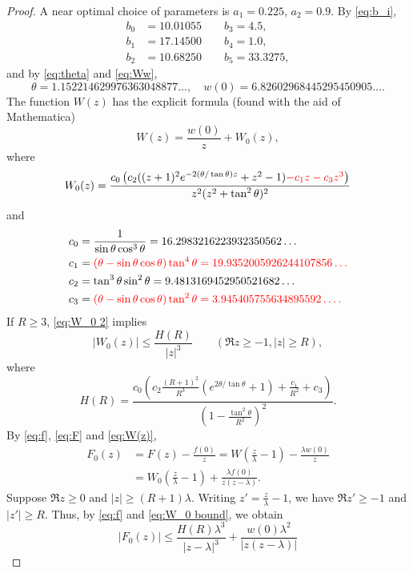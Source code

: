 \documentclass[10pt]{amsart}
\theoremstyle{remark}
\theoremstyle{plain}
\numberwithin{equation}{section}
\theoremstyle{definition}
\def\({\left(}
\def\){\right)}
\def\lam{\lambda}
\newcommand{\rev}[1]{{\color{red}#1}}
\begin{document}
\begin{proof}
A near optimal choice of parameters is $a_1=0.225$, $a_2=0.9$.
By \eqref{eq:b_i},
\begin{align*}
b_0 &= 10.01055 \qquad b_3 = 4.5, \\
b_1 &= 17.14500 \qquad b_4 = 1.0, \\
b_2 &= 10.68250 \qquad b_5 = 33.3275,
\end{align*}
and by \eqref{eq:theta} and \eqref{eq:Ww},
$$
\theta = 1.152214629976363048877\ldots, \quad w(0) = 6.82602968445295450905
\ldots.
$$
The function $W(z)$ has the explicit formula (found with the aid of \rev{Mathematica})
\begin{equation}
W(z) = \frac{w(0)}{z} + W_0(z),
\label{eq:W(z)}
\end{equation}
where
\begin{equation}
W_0(z) = \frac{c_0 \( c_2 ((z+1)^2 e^{-2(\theta/\tan\theta)z} + z^2-1) 
\rev{-c_1 z - c_3 z^3}\)}{z^2(z^2+\tan^2 \theta)^2}
\label{eq:W_0 2}
\end{equation}
and
\begin{align*}
c_0 &= \frac{1}{\sin \theta \cos^3 \theta} = 16.2983216223932350562\ldots \\
c_1 &= \rev{(\theta - \sin\theta\cos\theta)\tan^4 \theta =
   19.9352005926244107856\ldots} \\
c_2 &= \tan^3 \theta \sin^2 \theta = 9.4813169452950521682\ldots \\
c_3 &=  \rev{(\theta - \sin\theta\cos\theta)\tan^2 \theta 
 = 3.945405755634895592\ldots.} 
\end{align*}
If $R \ge 3$, \eqref{eq:W_0 2} implies 
\begin{equation}
|W_0(z)| \le \frac{H(R)}{|z|^3} \qquad (\Re z\ge -1, |z|\ge R),
\label{eq:W_0 bound}
\end{equation}
where
$$
H(R) = \frac{c_0 \( c_2 \tfrac{(R+1)^2}{R^3}\( e^{2\theta/\tan\theta} + 1\) +
\tfrac{c_1}{R^2}+c_3 \)}{\(1-\tfrac{\tan^2\theta}{R^2}\)^2}.
$$
By \eqref{eq:f}, \eqref{eq:F} and \eqref{eq:W(z)},
\begin{align*}
F_0(z) &= F(z) - \frac{f(0)}{z} = W\( \frac{z}{\lam}-1 \) - \frac{\lam
w(0)}{z} \\
&= W_0 \( \frac{z}{\lam}-1 \) + \frac{\lam f(0)}{z(z-\lam)}.
\end{align*}
Suppose $\Re z \ge 0$ and $|z| \ge (R+1) \lam$.  Writing
$z'=\frac{z}{\lam}-1$, we have $\Re z' \ge -1$ and $|z'| \ge R$.  Thus,
by \eqref{eq:f} and \eqref{eq:W_0 bound}, we obtain
$$
|F_0(z)| \le  \frac{H(R)\lam^3}{|z-\lam|^3}+ \frac{w(0)\lam^2}{|z(z-\lam)|}
$$
\end{proof}
\end{document}
